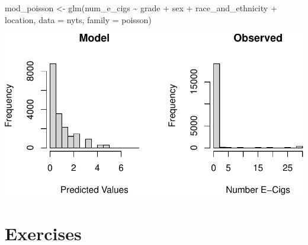 \documentclass[
  letterpaper,
]{krantz}
\makeatletter
\newenvironment{Shaded}{\begin{snugshade}}{\end{snugshade}}
\newcommand{\AttributeTok}[1]{\textcolor[rgb]{0.40,0.45,0.13}{#1}}
\newcommand{\DecValTok}[1]{\textcolor[rgb]{0.68,0.00,0.00}{#1}}
\newcommand{\FunctionTok}[1]{\textcolor[rgb]{0.28,0.35,0.67}{#1}}
\newcommand{\NormalTok}[1]{\textcolor[rgb]{0.00,0.23,0.31}{#1}}
\newcommand{\OtherTok}[1]{\textcolor[rgb]{0.00,0.23,0.31}{#1}}
\newcommand{\SpecialCharTok}[1]{\textcolor[rgb]{0.37,0.37,0.37}{#1}}
\newcommand{\StringTok}[1]{\textcolor[rgb]{0.13,0.47,0.30}{#1}}
\newenvironment{kframe}{%
\medskip{}
\setlength{\fboxsep}{.8em}
 \def\at@end@of@kframe{}%
 \ifinner\ifhmode%
  \def\at@end@of@kframe{\end{minipage}}%
  \begin{minipage}{\columnwidth}%
 \fi\fi%
 \def\FrameCommand##1{\hskip\@totalleftmargin \hskip-\fboxsep
 \colorbox{shadecolor}{##1}\hskip-\fboxsep
     \hskip-\linewidth \hskip-\@totalleftmargin \hskip\columnwidth}%
 \MakeFramed {\advance\hsize-\width
   \@totalleftmargin\z@ \linewidth\hsize
   \@setminipage}}%
 {\par\unskip\endMakeFramed%
 \at@end@of@kframe}
\renewenvironment{Shaded}{\begin{kframe}}{\end{kframe}}
\makeatother
\begin{document}
\begin{Shaded}
\begin{Highlighting}[]
\NormalTok{mod\_poisson }\OtherTok{\textless{}{-}} \FunctionTok{glm}\NormalTok{(num\_e\_cigs }\SpecialCharTok{\textasciitilde{}}\NormalTok{ grade }\SpecialCharTok{+}\NormalTok{ sex }\SpecialCharTok{+}\NormalTok{ race\_and\_ethnicity }\SpecialCharTok{+} 
\NormalTok{                     location, }\AttributeTok{data =}\NormalTok{ nyts, }\AttributeTok{family =}\NormalTok{ poisson)}
\end{Highlighting}
\end{Shaded}

\begin{Shaded}
\end{Shaded}

\begin{center}
\includegraphics[width=1\textwidth,height=\textheight]{book/logistic_regression_files/figure-pdf/unnamed-chunk-25-1.pdf}
\end{center}

\section{Exercises}\label{exercises-9}
\end{document}
